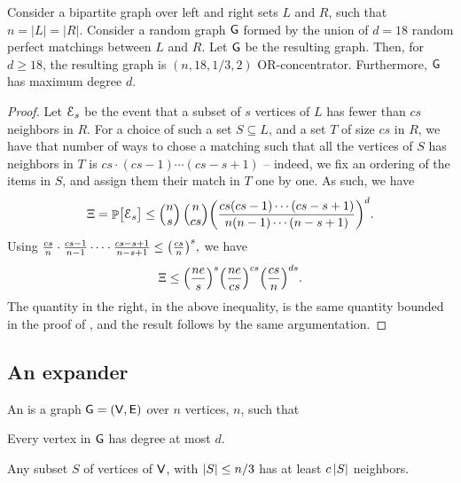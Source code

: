 \begin{theorem}
    Consider a bipartite graph over left and right sets $L$ and $R$,
    such that $n = |L|=|R|$. Consider a random graph $\mathsf{G}$ formed by
    the union of $d = 18$ random perfect matchings between $L$ and
    $R$.  Let $\mathsf{G}$ be the resulting graph. Then, for $d \geq 18$, the
    resulting graph is $(n,18, 1/3, 2)$ OR-concentrator. Furthermore,
    $\mathsf{G}$ has maximum degree $d$.
\end{theorem}
\begin{proof}
    Let $\EuScript{E}_s$ be the event that a subset of $s$ vertices of $L$
    has fewer than $cs$ neighbors in $R$.  For a choice of such a set
    $S \subseteq L$, and a set $T$ of size $cs$ in $R$, we have that
    number of ways to chose a matching such that all the vertices of
    $S$ has neighbors in $T$ is $cs \cdot (cs-1) \cdots (cs -s+1)$ --
    indeed, we fix an ordering of the items in $S$, and assign them
    their match in $T$ one by one. As such, we have
    \begin{equation*}
        \Xi%
        =%
        \Prob{\bigl.\Event_s}%
        \leq%
        \mybinom{n}{s} \, \mybinom{n}{cs}
        \pth{ \frac{cs (cs-1) \cdots ( cs-s+1)}{n (n-1) \cdots (n-s+1)}}^{d}.%
    \end{equation*}
    Using
    \begin{math}
        \frac{cs}{n} \cdot \frac{cs-1}{n-1} \cdots \cdot
        \frac{cs-s+1}{n-s+1} \leq \pth{\frac{cs}{n}}^s,
    \end{math}
    we have
    \begin{equation*}            
        \Xi%
        \leq%
        \pth{\frac{ne}{s}}^s \pth{\frac{ne}{cs}}^{cs} \pth{
           \frac{cs}{n}}^{ds}.
    \end{equation*}
    The quantity in the right, in the above inequality, is the same
    quantity bounded in the proof of , and the
    result follows by the same argumentation.
\end{proof}


\subsection{An expander}

\begin{defn}
    An  is a graph $\mathsf{G}=(\mathsf{V},\mathsf{E})$
    over $n$ vertices, $n$, such that
    \begin{compactenumi}
        \item Every vertex in $\mathsf{G}$ has degree at most $d$.
        
        \item Any subset $S$ of vertices of $\mathsf{V}$, with
        $\left| {S} \right| \leq n/3$ has at least $c \left| {S} \right|$ neighbors.
    \end{compactenumi}
\end{defn}


